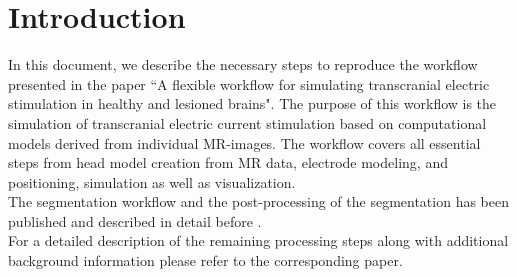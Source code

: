\section{Introduction}
In this document, we describe the necessary steps to reproduce the workflow presented
in the paper ``A flexible workflow for simulating transcranial electric stimulation in healthy 
and lesioned brains".
The purpose of this workflow is the simulation of transcranial electric current stimulation
based on computational models derived from individual MR-images. The workflow covers all essential
steps from head model creation from MR data, electrode modeling, and positioning, simulation
as well as visualization.\\
The segmentation workflow and the post-processing of the segmentation has been published and
described in detail before \cite{kalloch2018semi}.\\
For a detailed description of the remaining processing steps along with additional
background information please refer to the corresponding paper. 
